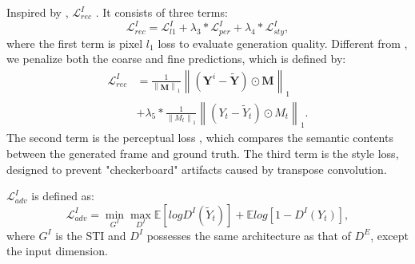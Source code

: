 
Inspired by \cite{nazeri2019edgeconnect}, $\mathcal{L}^{I}_{rec}$ . It consists of three terms:
\begin{equation}
\mathcal{L}^{I}_{rec}=\mathcal{L}^{I}_{l1}+\lambda_3 *\mathcal{L}^{I}_{per}+\lambda_4 *\mathcal{L}^{I}_{sty},
\end{equation}
%
where the first term is pixel $l_1$ loss to evaluate generation quality. Different from \cite{nazeri2019edgeconnect}, we penalize both the coarse and fine predictions, which is defined by:
\begin{equation}
\begin{aligned}
\mathcal{L}^{I}_{rec}&=\frac{1}{\left\|\boldsymbol{M} \right\|_1}\left\|(\boldsymbol{Y}^i-\widetilde{\boldsymbol{Y}})\odot \boldsymbol{M}\right\|_1\\ &+\lambda_5*\frac{1}{\left\|M_t \right\|_1}\left\|(Y_t-\widetilde{Y}_t)\odot M_t\right\|_1.
\end{aligned}
\end{equation}
%
The second term is the perceptual loss \cite{gatys2015neural}, which compares the semantic contents between the generated frame and ground truth. The third term is the style loss, designed to prevent "checkerboard" artifacts \cite{Sajjadi_2017_ICCV} caused by transpose convolution.
 
 

$\mathcal{L}^I_{adv}$ is defined as:
\begin{equation}
\label{eq:inp_adver}
\mathcal{L}^I_{adv}=\min\limits_{G^I} \max \limits_{D^I}\mathbb{E}[logD^I(\widetilde{Y}_t)]+\mathbb{E}log[1-D^I(Y_{t})],
\end{equation}
where $G^I$ is the STI and $D^I$ possesses the same architecture as that of $D^E$, except the input dimension.





